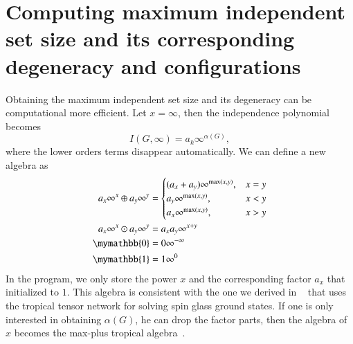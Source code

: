 \documentclass{article}
\newcommand{\<}{\langle}
\renewcommand{\>}{\rangle}
\renewcommand{\cite}[1]{{\citep{#1}}}
\theoremstyle{definition}\newtheorem{definition}{\textit{Definition}}
\begin{document}
\section{Computing maximum independent set size and its corresponding degeneracy and configurations}
Obtaining the maximum independent set size and its degeneracy can be computational more efficient. Let $x=\infty$, then the independence polynomial becomes
\begin{equation}
I(G, \infty) = a_k \infty^{\alpha(G)},
\end{equation}
where the lower orders terms disappear automatically. We can define a new algebra as
\begin{align}
\begin{split}
    a_x\infty^x \oplus a_y\infty^y &= \begin{cases}
        (a_x + a_y)\infty^{\max(x,y)}, & x = y\\
        a_y\infty^{\max(x,y)}, & x < y\\
        a_x\infty^{\max(x,y)}, & x > y
    \end{cases}\\
    a_x\infty^x \odot a_y\infty^y &= a_x a_y\infty^{x+y}\\
    \mymathbb{0} &= 0\infty^{-\infty}\\
    \mymathbb{1} &= 1\infty^{0}
\end{split}
\end{align}
In the program, we only store the power $x$ and the corresponding factor $a_x$ that initialized to $1$.
This algebra is consistent with the one we derived in ~\cite{Liu2021} that uses the tropical tensor network for solving spin glass ground states.
If one is only interested in obtaining $\alpha(G)$, he can drop the factor parts, then the algebra of $x$ becomes the max-plus tropical algebra~\cite{Maclagan2015,Moore2011}.
\end{document}
